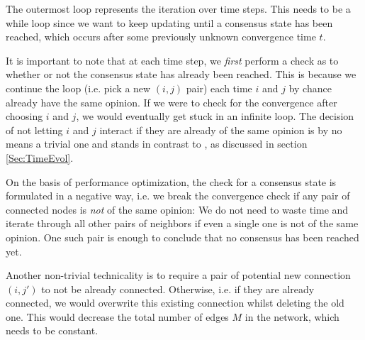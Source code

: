 \documentclass[11pt]{article}
\begin{document}
The outermost loop represents the iteration over time steps. This needs to be a while loop since we want to keep updating until a consensus state has been reached, which occurs after some previously unknown convergence time $t$.

It is important to note that at each time step, we \emph{first} perform a check as to whether or not the consensus state has already been reached. This is because we continue the loop (i.e. pick a new $(i,j)$ pair) each time $i$ and $j$ by chance already have the same opinion. If we were to check for the convergence after choosing $i$ and $j$, we would eventually get stuck in an infinite loop. The decision of not letting $i$ and $j$ interact if they are already of the same opinion is by no means a trivial one and stands in contrast to \cite{main paper}, as discussed in section \ref{Sec:TimeEvol}.

On the basis of performance optimization, the check for a consensus state is formulated in a negative way, i.e. we break the convergence check if any pair of connected nodes is \emph{not} of the same opinion: We do not need to waste time and iterate through all other pairs of neighbors if even a single one is not of the same opinion. One such pair is enough to conclude that no consensus has been reached yet.

Another non-trivial technicality is to require a pair of potential new connection $(i,j')$ to not be already connected. Otherwise, i.e. if they are already connected, we would overwrite this existing connection whilst deleting the old one. This would decrease the total number of edges $M$ in the network, which needs to be constant.
\end{document}
